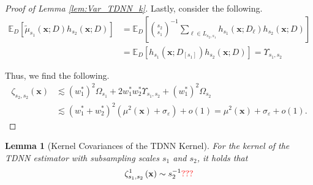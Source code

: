 \documentclass[letterpaper,10pt]{article}
\numberwithin{equation}{section}
\numberwithin{thm}{section}
\newtheorem{lem}{Lemma}
\numberwithin{lem}{section}
\numberwithin{cor}{section}
\newcommand{\E}{\mathbb{E}}
\newcommand{\1}{\mathbbm{1}}
\begin{document}
\begin{proof}[Proof of Lemma \ref{lem:Var_TDNN_k}]
	Lastly, consider the following.
	\begin{equation}
		\begin{aligned}
			\E_{D}\left[\tilde{\mu}_{s_1}\left(\mathbf{x}; D\right) h_{s_2}\left(\mathbf{x}; D\right)\right]
			 & = \E_D\left[\binom{s_2}{s_1}^{-1}\sum_{\ell \in L_{s_2, s_1}} h_{s_1}\left(\mathbf{x}; D_{\ell}\right)h_{s_2}\left(\mathbf{x}; D\right)\right] \\
			 & = \E_D\left[h_{s_1}\left(\mathbf{x}; D_{[s_1]}\right)h_{s_2}\left(\mathbf{x}; D\right)\right]
			= \Upsilon_{s_1, s_2}
		\end{aligned}
	\end{equation}

	Thus, we find the following.
	\begin{equation}
		\begin{aligned}
			\zeta_{s_2, s_2}\left(\mathbf{x}\right)
			 & \lesssim \left(w_{1}^{*}\right)^2 \Omega_{s_1}
			+ 2 w_{1}^{*}w_{2}^{*} \Upsilon_{s_1, s_2}
			+ \left(w_{1}^{*}\right)^2 \Omega_{s_2}                                                                       \\
			 & \lesssim \left(w_{1}^{*} + w_{2}^{*}\right)^2 \left(\mu^2(\mathbf{x}) + \sigma_{\varepsilon}\right) + o(1)
			= \mu^2(\mathbf{x}) + \sigma_{\varepsilon} + o(1).
		\end{aligned}
	\end{equation}
\end{proof}

\newpage

\begin{lem}[Kernel Covariances of the TDNN Kernel]\label{lem:Cov_TDNN_k}
	For the kernel of the TDNN estimator with subsampling scales $s_1$ and $s_2$, it holds that
	\begin{equation}
		\zeta_{s_1, s_2}^{1}\left(\mathbf{x}\right)
		\sim s_2^{-1}
		{\color{red} ???}
	\end{equation}
\end{lem}
\end{document}
